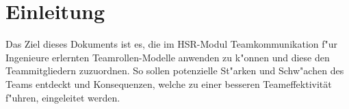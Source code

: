 
\chapter{Einleitung}

Das Ziel dieses Dokuments ist es, die im HSR-Modul Teamkommunikation f"ur Ingenieure erlernten
Teamrollen-Modelle\cite{belbin1981management} anwenden zu k"onnen und diese den Teammitgliedern zuzuordnen. So sollen potenzielle
St"arken und Schw"achen des Teams entdeckt und Konsequenzen, welche zu einer besseren Teameffektivität f"uhren, eingeleitet werden.